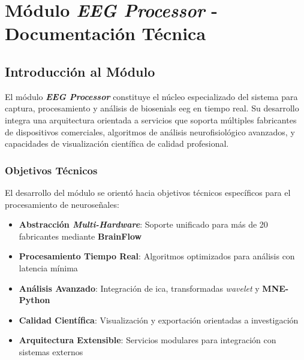 {
\titlespacing*{\chapter}{0pt}{-0.1\textheight}{30pt}
\chapter[Documentación Técnica \textit{\textbf{EEG Processor}}]{Módulo \textit{\textbf{EEG Processor}} - Documentación Técnica}
\label{chap:anexo_eeg_processor}
}

\section{Introducción al Módulo}
\label{sec:intro_eeg_processor}

El módulo \textit{\textbf{EEG Processor}} constituye el núcleo especializado del sistema para captura, procesamiento y análisis de \glspl{biosenial} \acrshort{eeg} en tiempo real. Su desarrollo integra una arquitectura orientada a servicios que soporta múltiples fabricantes de dispositivos comerciales, algoritmos de análisis neurofisiológico avanzados, y capacidades de visualización científica de calidad profesional.

\subsection{Objetivos Técnicos}
\label{subsec:objetivos_eeg_processor}

El desarrollo del módulo se orientó hacia objetivos técnicos específicos para el procesamiento de neuroseñales:

\begin{itemize}
    \item \textbf{Abstracción \textit{Multi-Hardware}}: Soporte unificado para más de 20 fabricantes mediante \textbf{BrainFlow}
    \item \textbf{Procesamiento Tiempo Real}: Algoritmos optimizados para análisis con latencia mínima
    \item \textbf{Análisis Avanzado}: Integración de \acrshort{ica}, transformadas \textit{\gls{wavelet}} y \textbf{MNE-Python}
    \item \textbf{Calidad Científica}: Visualización y exportación orientadas a investigación
    \item \textbf{Arquitectura Extensible}: Servicios modulares para integración con sistemas externos
\end{itemize}

